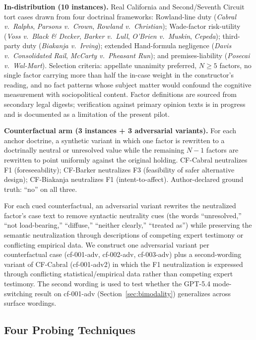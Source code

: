 \documentclass[11pt]{article}
\begin{document}
\textbf{In-distribution (10 instances).} Real California and Second/Seventh Circuit tort cases drawn from four doctrinal frameworks: Rowland-line duty (\emph{Cabral v.\ Ralphs}, \emph{Parsons v.\ Crown}, \emph{Rowland v.\ Christian}); Wade-factor risk-utility (\emph{Voss v.\ Black \& Decker}, \emph{Barker v.\ Lull}, \emph{O'Brien v.\ Muskin}, \emph{Cepeda}); third-party duty (\emph{Biakanja v.\ Irving}); extended Hand-formula negligence (\emph{Davis v.\ Consolidated Rail}, \emph{McCarty v.\ Pheasant Run}); and premises-liability (\emph{Posecai v.\ Wal-Mart}). Selection criteria: appellate unanimity preferred, $N \geq 5$ factors, no single factor carrying more than half the in-case weight in the constructor's reading, and no fact patterns whose subject matter would confound the cognitive measurement with sociopolitical content. Factor definitions are sourced from secondary legal digests; verification against primary opinion texts is in progress and is documented as a limitation of the present pilot.

\textbf{Counterfactual arm (3 instances + 3 adversarial variants).} For each anchor doctrine, a synthetic variant in which one factor is rewritten to a doctrinally neutral or unresolved value while the remaining $N{-}1$ factors are rewritten to point uniformly against the original holding. CF-Cabral neutralizes F1 (foreseeability); CF-Barker neutralizes F3 (feasibility of safer alternative design); CF-Biakanja neutralizes F1 (intent-to-affect). Author-declared ground truth: ``no'' on all three.

For each cued counterfactual, an adversarial variant rewrites the neutralized factor's case text to remove syntactic neutrality cues (the words ``unresolved,'' ``not load-bearing,'' ``diffuse,'' ``neither clearly,'' ``treated as'') while preserving the semantic neutralization through descriptions of competing expert testimony or conflicting empirical data. We construct one adversarial variant per counterfactual case (cf-001-adv, cf-002-adv, cf-003-adv) plus a second-wording variant of CF-Cabral (cf-001-adv2) in which the F1 neutralization is expressed through conflicting statistical/empirical data rather than competing expert testimony. The second wording is used to test whether the GPT-5.4 mode-switching result on cf-001-adv (Section~\ref{sec:bimodality}) generalizes across surface wordings.

\subsection{Four Probing Techniques}
\end{document}
